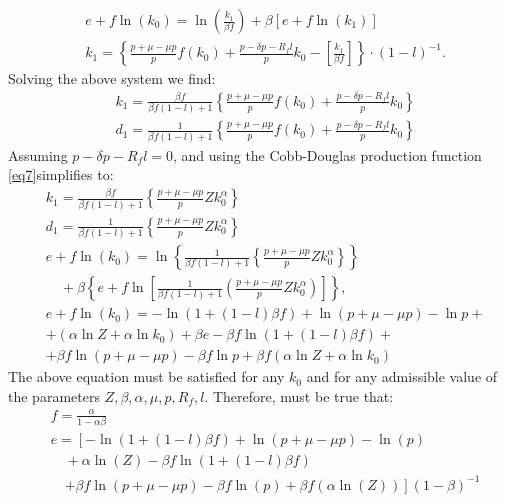 \documentclass[12pt]{report}
\begin{document}
 \begin{align}
    &e + f \ln(k_0) = \ln\left( \frac{k_1}{\beta f} \right) + \beta \left[ e + f \ln(k_1) \right] \label{eq28}\\
    &k_1 = \left\{ \frac{p + \mu - \mu p}{p}f(k_{0}) + \frac{p - \delta p - R_f l}{p} k_{0} - \left[ \frac{k_1}{\beta f} \right] \right\} \cdot \left(1-l\right)^{-1}. \nonumber
\end{align}
Solving the above system we find:
\begin{align*}
    &k_1 = \frac{\beta f}{\beta f (1-l)+1}\left\{ \frac{p + \mu - \mu p}{p}f(k_{0}) + \frac{p - \delta p - R_f l}{p} k_{0}\right\}\\
    &d_1 =\frac{1}{\beta f (1-l)+1}\left\{ \frac{p + \mu - \mu p}{p}f(k_{0}) + \frac{p - \delta p - R_f l}{p} k_{0}\right\}
\end{align*}
Assuming \(p - \delta p - R_f l = 0\), and using the Cobb-Douglas production function \ref{eq7}simplifies to:
\begin{align*}
    &k_1 = \frac{\beta f}{\beta f (1-l)+1}\left\{ \frac{p + \mu - \mu p}{p}Z k_0^{\alpha}\right\}\\
    &d_1 =\frac{1}{\beta f (1-l)+1}\left\{  \frac{p + \mu - \mu p}{p}Z k_0^{\alpha}\right\}\\
    &e + f \ln(k_0) = \ln \left\{ \frac{1}{\beta f (1-l)+1}\left\{ \frac{p + \mu - \mu p}{p}Z k_0^{\alpha}\right\}\right\} \nonumber \\
    &\quad + \beta \left\{ e + f \ln \left[ \frac{1}{\beta f (1-l)+1}\left(  \frac{p + \mu - \mu p}{p}Z k_0^{\alpha}\right)\right]  \right\},\\
    &e + f \ln(k_0) = -\ln{(1+(1-l)\beta f)} + \ln{(p + \mu - \mu p)} - \ln{p} +\\
    &+({\alpha}\ln{Z} + {\alpha}\ln{k_0}) + \beta e - \beta f \ln{(1+(1-l)\beta f)} +\\
    &+\beta f \ln{(p + \mu - \mu p)} - \beta f \ln{p} + \beta f ({\alpha}\ln{Z} + {\alpha}\ln{k_0})
\end{align*}
The above equation must be satisfied for any \(k_0\) and for any admissible value of the parameters \(Z, \beta, \alpha,
\mu, p, R_f,l\). Therefore, must be true that:
\begin{align*}
    &f = \frac{\alpha}{1-\alpha \beta} \\
    &e = \left[ -\ln(1+(1-l)\beta f) + \ln(p + \mu - \mu p) - \ln(p) \right.\\
    &\quad + \alpha\ln(Z) - \beta f \ln(1+(1-l)\beta f) \\
    &\quad \left. + \beta f \ln(p + \mu - \mu p) - \beta f \ln(p) + \beta f (\alpha\ln(Z)) \right](1-\beta)^{-1}
\end{align*}
\end{document}
